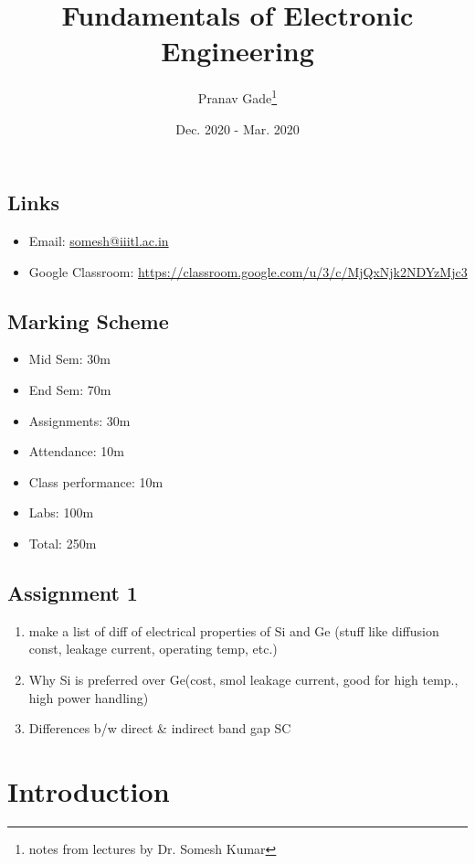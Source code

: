 \documentclass[10pt, a4paper]{report}
\author{Pranav Gade\thanks{notes from lectures by Dr. Somesh Kumar}}
\date{Dec. 2020 - Mar. 2020}
\title{Fundamentals of Electronic Engineering}
\begin{document}
	\maketitle
	\section*{Links}
	\begin{itemize}
		\item Email: \href{somesh@iiitl.ac.in}{somesh@iiitl.ac.in}
		\item Google Classroom: \href{https://classroom.google.com/u/3/c/MjQxNjk2NDYzMjc3}{https://classroom.google.com/u/3/c/MjQxNjk2NDYzMjc3}
	\end{itemize}
	\section*{Marking Scheme}
	\begin{itemize}
		\item Mid Sem: 30m
		\item End Sem: 70m
		\item Assignments: 30m
		\item Attendance: 10m
		\item Class performance: 10m
		\item Labs: 100m
		\item Total: 250m
	\end{itemize}
	\section*{Assignment 1}
	\begin{enumerate}
		\item make a list of diff of electrical properties of Si and Ge (stuff like diffusion const, leakage current, operating temp, etc.)
		\item Why Si is preferred over Ge(cost, smol leakage current, good for high temp., high power handling)
		\item Differences b/w direct \& indirect band gap SC
	\end{enumerate}
	\newpage
	
	\chapter{Introduction}	
\end{document}
